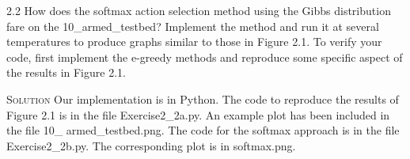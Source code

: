 \documentclass{article}
\begin{document}
2.2 How does the softmax action selection method using the Gibbs 
distribution fare on the 10\_armed\_testbed? Implement the method and 
run it at several temperatures to produce graphs similar to those in 
Figure 2.1. To verify your code, first implement the e-greedy 
methods and reproduce some specific aspect of the results in 
Figure 2.1.

\textsc{Solution} Our implementation is in Python. The 
code to reproduce the results of Figure 2.1 is in the file 
Exercise2\_2a.py. An example plot has been included in the file 10\_
armed\_testbed.png. The code for the softmax approach is in the 
file Exercise2\_2b.py. The corresponding plot is in 
softmax.png.
\end{document}
